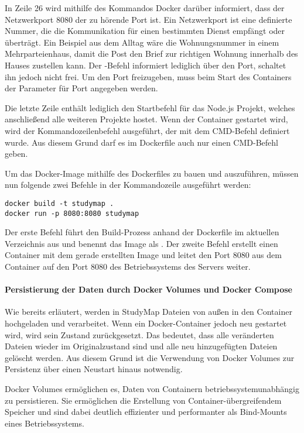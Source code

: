 In Zeile 26 wird mithilfe des Kommandos  Docker darüber informiert, dass der Netzwerkport 8080 der zu hörende Port ist. Ein Netzwerkport ist eine definierte Nummer, die die Kommunikation für einen bestimmten Dienst empfängt oder überträgt. \parencite{wright_was_2022} Ein Beispiel aus dem Alltag wäre die Wohnungsnummer in einem Mehrparteienhaus, damit die Post den Brief zur richtigen Wohnung innerhalb des Hauses zustellen kann. Der -Befehl informiert lediglich über den Port, schaltet ihn jedoch nicht frei. Um den Port freizugeben, muss beim Start des Containers der Parameter  für Port angegeben werden. \parencite{docker_inc_dockerfile_2024}

Die letzte Zeile enthält lediglich den Startbefehl für das Node.js Projekt, welches anschließend alle weiteren Projekte hostet. Wenn der Container gestartet wird, wird der Kommandozeilenbefehl ausgeführt, der mit dem CMD-Befehl definiert wurde. Aus diesem Grund darf es im Dockerfile auch nur einen CMD-Befehl geben. \parencite{docker_inc_dockerfile_2024}

Um das Docker-Image mithilfe des Dockerfiles zu bauen und auszuführen, müssen nun folgende zwei Befehle in der Kommandozeile ausgeführt werden:
\begin{lstlisting}[style=Python]
docker build -t studymap .
docker run -p 8080:8080 studymap
\end{lstlisting}

Der erste Befehl führt den Build-Prozess anhand der Dockerfile im aktuellen Verzeichnis aus und benennt das Image als . Der zweite Befehl erstellt einen Container mit dem gerade erstellten Image und leitet den Port 8080 aus dem Container auf den Port 8080 des Betriebssystems des Servers weiter.

\paragraph*{Persistierung der Daten durch Docker Volumes und Docker Compose}
Wie bereits erläutert, werden in StudyMap Dateien von außen in den Container hochgeladen und verarbeitet. Wenn ein Docker-Container jedoch neu gestartet wird, wird sein Zustand zurückgesetzt. Das bedeutet, dass alle veränderten Dateien wieder im Originalzustand sind und alle neu hinzugefügten Dateien gelöscht werden. Aus diesem Grund ist die Verwendung von Docker Volumes zur Persistenz über einen Neustart hinaus notwendig.

Docker Volumes ermöglichen es, Daten von Containern betriebssystemunabhängig zu persistieren. Sie ermöglichen die Erstellung von Container-übergreifendem Speicher und sind dabei deutlich effizienter und performanter als Bind-Mounts eines Betriebssystems. \parencite{docker_inc_volumes_0000}


